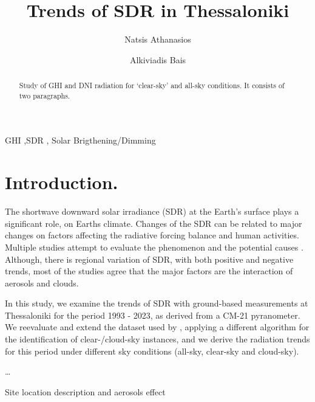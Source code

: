 \documentclass[preprint, 3p,
authoryear]{elsarticle} %
\begin{document}
\begin{frontmatter}

  \title{Trends of SDR in Thessaloniki}
    \author[Laboratory of Atmospheric Physics]{Natsis Athanasios%
  }
    \author[Laboratory of Atmospheric Physics]{Alkiviadis Bais%
  }
  
  \begin{abstract}
  Study of GHI and DNI radiation for `clear-sky' and all-sky conditions.
  It consists of two paragraphs.
  \end{abstract}
    \begin{keyword}
    GHI \sep SDR \sep 
    Solar Brigthening/Dimming
  \end{keyword}
  
 \end{frontmatter}

\hypertarget{introduction.}{%
\section{Introduction.}\label{introduction.}}

The shortwave downward solar irradiance (SDR) at the Earth's surface
plays a significant role, on Earths climate. Changes of the SDR can be
related to major changes on factors affecting the radiative forcing
balance and human activities. Multiple studies attempt to evaluate the
phenomenon and the potential causes
\citep{Ohvril2009, Schwarz2020, Wild2009, Wild2012, Xia2007, Zerefos2009}.
Although, there is regional variation of SDR, with both positive and
negative trends, most of the studies agree that the major factors are
the interaction of aerosols and clouds.

In this study, we examine the trends of SDR with ground-based
measurements at Thessaloniki for the period 1993 - 2023, as derived from
a CM-21 pyranometer. We reevaluate and extend the dataset used by
\citet{Bais2013}, applying a different algorithm for the identification
of clear-/cloud-sky instances, and we derive the radiation trends for
this period under different sky conditions (all-sky, clear-sky and
cloud-sky).

\ldots{}

Site location description and aerosols effect
\end{document}
